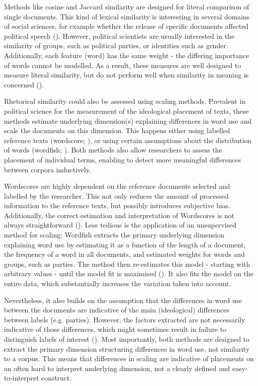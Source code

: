 \documentclass{article}
\begin{document}
Methods like cosine and Jaccard similarity are designed for literal comparison of single documents. This kind of lexical similarity is interesting in several domains of social sciences, for example whether the release of specific documents affected political speech (\cite{Similarity2007a, Hager2020}). However, political scientists are usually interested in the similarity of groups, such as political parties, or identities such as gender. Additionally, each feature (word) has the same weight - the differing importance of words cannot be modelled. As a result, these measures are well designed to measure literal similarity, but do not perform well when similarity in meaning is concerned (\cite{Prasetya2018}).\par

Rhetorical similarity could also be assessed using scaling methods. Prevalent in political science for the measurement of the ideological placement of texts, these methods estimate underlying dimension(s) explaining differences in word use and scale the documents on this dimension. This happens either using labelled reference texts (wordscore; \cite{Laver2003}), or using certain assumptions about the distribution of words (wordfish; \cite{Slapin2008}). Both methods also allow researchers to assess the placement of individual terms, enabling to detect more meaningful differences between corpora inductively. \par

Wordscores are highly dependent on the reference documents selected and labelled by the researcher. This not only reduces the amount of processed information to the reference texts, but possibly introduces subjective bias. Additionally, the correct estimation and interpretation of Wordscores is not always straightforward (\cite{Lowe2008}). Less tedious is the application of an unsupervised method for scaling: Wordfish extracts the primary underlying dimension explaining word use by estimating it as a function of the length of a document, the frequency of a word in all documents, and estimated weights for words and groups, such as parties. The method then re-estimates this model - starting with arbitrary values - until the model fit is maximised (\cite{Slapin2008}). It also fits the model on the entire data, which substantially increases the variation taken into account.\par

Nevertheless, it also builds on the assumption that the differences in word use between the documents are indicative of the main (ideological) differences between labels (e.g. parties). However, the factors extracted are not necessarily indicative of those differences, which might sometimes result in failure to distinguish labels of interest (\cite[292f]{Grimmer2013TextASData}). Most importantly, both methods are designed to extract the primary dimension structuring differences in word use, not similarity to a corpus. This means that differences in scaling are indicative of placements on an often hard to interpret underlying dimension, not a clearly defined and easy-to-interpret construct.\par
\end{document}

